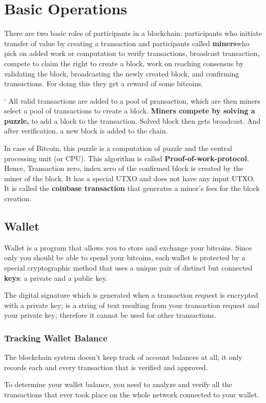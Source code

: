 \documentclass{article}
\begin{document}
\section{Basic Operations}
There are two basic roles of participants in a blockchain: participants who initiate transfer of value by creating a transaction and participants called \textbf{miners}who pick on added work or computation to verify transactions, broadcast transaction, compete to claim the right to create a block, work on reaching consensus by validating the block, broadcasting the newly created block, and confirming transactions. For doing this they get a reward of some bitcoins.\\ \par`
All valid transactions are added to a pool of pransaction, which are then miners select a pool of transactions to create a block. \textbf{Miners compete by solving a puzzle,} to add a block to the transaction. Solved block then gets broadcast. And after verification, a new block is added to the chain.\\ \par
In case of Bitcoin, this puzzle is a computation of puzzle and the central processing unit (or CPU). This algorithm is called \textbf{Proof-of-work-protocol}. Hence, Transaction zero, index zero of the confirmed block is created by the miner of the block. It has a special UTXO and does not have any input UTXO. It is called the \textbf{coinbase transaction} that generates a minor's fees for the block creation.
\subsection{Wallet}
Wallet is a program that allows you to store and exchange your bitcoins. Since only you should be able to spend your bitcoins, each wallet is protected by a special cryptographic method that uses a unique pair of distinct but connected \textbf{keys}: a private and a public key.\\
\par
The digital signature which is generated when a transaction request is encrypted with a private key; is a string of text resulting from your transaction request and your private key; therefore it cannot be used for other transactions.
\subsubsection{Tracking Wallet Balance}
The blockchain system doesn’t keep track of account balances at all; it only records each and every transaction that is verified and approved. \par
To determine your wallet balance, you need to analyze and verify all the transactions that ever took place on the whole network connected to your wallet.
\end{document}
